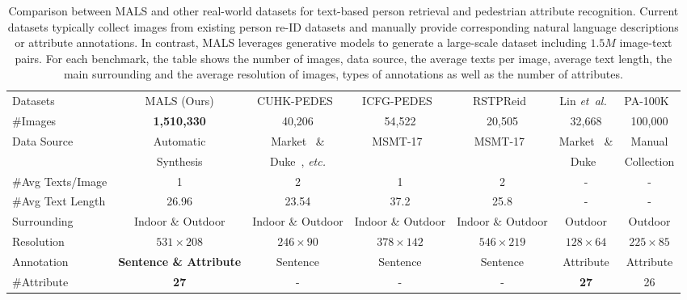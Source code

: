 \documentclass[sigconf]{acmart}
\def\etal{\emph{et~al.}}
\begin{document}
\setlength{\tabcolsep}{5pt}
\vspace{-.2in}
\begin{table*}[t]
\small
\begin{center}
\begin{tabular}{l|c|c|c|c|c|c}
\hline
Datasets & MALS (Ours) & CUHK-PEDES~\cite{li2017person} & ICFG-PEDES~\cite{ding2021semantically} & RSTPReid~\cite{zhu2021dssl} & Lin \etal~\cite{lin2019improving} & PA-100K~\cite{liu2017hydraplus} \\
\shline
\#Images           &  \textbf{1,510,330}  &  40,206  &  54,522  &  20,505  &  32,668  &  100,000  \\

\multirow{2}{*}{Data Source} & Automatic & Market~\cite{Zheng_2015_ICCV} \& & \multirow{2}{*}{MSMT-17~\cite{wei2018person}} & \multirow{2}{*}{MSMT-17~\cite{wei2018person}} & Market~\cite{Zheng_2015_ICCV} \& &  Manual \\
 & Synthesis & Duke~\cite{ristani2016performance}, \emph{etc.} & & & Duke~\cite{ristani2016performance} &  Collection \\
\#Avg Texts/Image  &  1  &  2  &  1  &  2  &  -  &  -  \\
\#Avg Text Length  &  26.96  &  23.54  &  37.2  &  25.8  &  -  &  -   \\ 
Surrounding        &  Indoor \& Outdoor  &  Indoor \& Outdoor  &  Indoor \& Outdoor  &  Indoor \& Outdoor  &  Outdoor  &  Outdoor  \\
Resolution         &  $531\times 208$  &  $246\times 90$  &  $378\times 142$  &  $546\times 219$  &  $128\times 64$  &  $225\times 85$  \\
Annotation         &  \textbf{Sentence \& Attribute}  &  Sentence  &  Sentence  &  Sentence  &  Attribute  &  Attribute  \\
\#Attribute        &  \textbf{27}  &  -  &  -  &  -  &  \textbf{27}  &  26  \\
\hline
\end{tabular}
\end{center}
\caption{Comparison between MALS and other real-world datasets for text-based person retrieval and pedestrian attribute recognition. Current datasets typically collect images from existing person re-ID datasets and manually provide corresponding natural language descriptions or attribute annotations. In contrast, MALS leverages generative models to generate a large-scale dataset including $1.5M$ image-text pairs.
For each benchmark, the table shows the number of images, data source, the average texts per image, average text length, the main surrounding and the average resolution of images, types of annotations as well as the number of attributes.
}
\label{table:Dataset}
\vspace{-.3in}
\end{table*}
\end{document}
